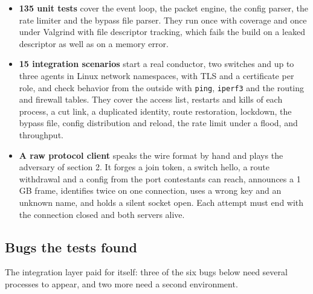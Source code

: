 \documentclass[11pt,a4paper]{article}
\providecommand{\tightlist}{\setlength{\itemsep}{0pt}\setlength{\parskip}{0pt}}
\begin{document}
\begin{itemize}
\tightlist
\item
  \textbf{135 unit tests} cover the event loop, the packet engine, the config parser, the rate limiter and the bypass file parser. They run once with coverage and once under Valgrind with file descriptor tracking, which fails the build on a leaked descriptor as well as on a memory error.
\item
  \textbf{15 integration scenarios} start a real conductor, two switches and up to three agents in Linux network namespaces, with TLS and a certificate per role, and check behavior from the outside with \texttt{ping}, \texttt{iperf3} and the routing and firewall tables. They cover the access list, restarts and kills of each process, a cut link, a duplicated identity, route restoration, lockdown, the bypass file, config distribution and reload, the rate limit under a flood, and throughput.
\item
  \textbf{A raw protocol client} speaks the wire format by hand and plays the adversary of section 2. It forges a join token, a switch hello, a route withdrawal and a config from the port contestants can reach, announces a 1 GB frame, identifies twice on one connection, uses a wrong key and an unknown name, and holds a silent socket open. Each attempt must end with the connection closed and both servers alive.
\end{itemize}

\hypertarget{bugs-the-tests-found}{%
\subsection{Bugs the tests found}\label{bugs-the-tests-found}}

The integration layer paid for itself: three of the six bugs below need several processes to appear, and two more need a second environment.
\end{document}
